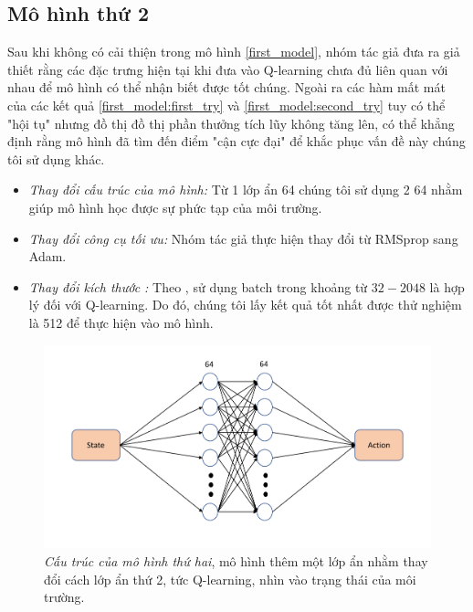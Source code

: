 \subsection{Mô hình thứ 2}\label{second_model}
Sau khi không có cải thiện trong mô hình \ref{first_model}, nhóm tác giả đưa ra giả thiết rằng các đặc trưng hiện tại khi đưa vào Q-learning chưa đủ liên quan với nhau để mô hình có thể nhận biết được tốt chúng. Ngoài ra các hàm mất mát của các kết quả \ref{first_model:first_try} và \ref{first_model:second_try} tuy có thể "hội tụ" nhưng đồ thị đồ thị phần thưởng tích lũy không tăng lên, có thể khẳng định rằng mô hình đã tìm đến điểm "cận cực đại" để khắc phục vấn đề này chúng tôi sử dụng khác. 
\begin{itemize}
    \item \textit{Thay đổi cấu trúc của mô hình:} Từ 1 lớp ẩn 64 chúng tôi sử dụng 2  64 nhằm giúp mô hình học được sự phức tạp của môi trường.
    \item \textit{Thay đổi công cụ tối ưu:} Nhóm tác giả thực hiện thay đổi từ RMSprop sang Adam.
    \item \textit{Thay đổi kích thước :}  Theo  \cite{DBLP:journals/corr/abs-1803-02811}, sử dụng batch trong khoảng từ $32-2048$ là hợp lý đối với Q-learning. Do đó, chúng tôi lấy kết quả tốt nhất được thử nghiệm là 512 để thực hiện vào mô hình.
\end{itemize}
\begin{figure}[h]
    \centering
    \includegraphics[width=\linewidth]{Pic/Second_model/second_arch.pdf}
    \caption[Cấu trúc của mô hình thứ hai]{\textit{Cấu trúc của mô hình thứ hai}, mô hình thêm một lớp ẩn nhằm thay đổi cách lớp ẩn thứ 2, tức Q-learning, nhìn vào trạng thái của môi trường.}
    \label{fig:second_arch}
\end{figure}

